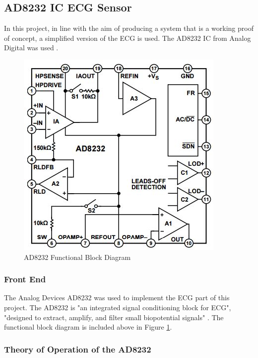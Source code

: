 \subsection{AD8232 IC ECG Sensor}

In this project, in line with the aim of producing a system that is a working proof of concept, a simplified version of the ECG is used. The AD8232 IC from Analog Digital was used \cite{ad8232datasheet}. 

\begin{figure}[H]
	\centering
	\includegraphics[width=0.4\linewidth]{ad8232funcdiagram.jpg}
	\caption{AD8232 Functional Block Diagram \cite{ad8232datasheet}}
	\label{ad8232functional}
\end{figure}

\subsubsection{Front End}

The Analog Devices AD8232 was used to implement the ECG part of this project. The AD8232 is "an integrated signal conditioning block for ECG", "designed to extract, amplify, and filter small biopotential signals" \cite{ad8232datasheet}. The functional block diagram is included above in Figure \ref{ad8232functional}. 


\subsubsection*{Theory of Operation of the AD8232}

